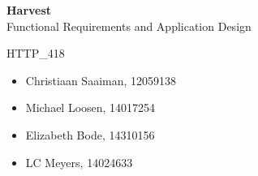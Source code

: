 \documentclass[11pt,fleqn]{book} %
\begin{document}

\begingroup
\thispagestyle{empty}
\centering
\vspace*{5cm}
\par\normalfont\fontsize{35}{35}\sffamily\selectfont
\textbf{Harvest}\\
{\LARGE Functional Requirements and Application Design}\par %
\vspace*{0.5cm}
{\Huge HTTP\_418}\par
\centering
\vspace*{0.5cm}
\begin{itemize}[label={}, noitemsep]	
		\Large
		\item \begin{center} Christiaan Saaiman, 12059138 \end{center}
		\item \begin{center} Michael Loosen, 14017254 \end{center}
		\item \begin{center} Elizabeth Bode, 14310156 \end{center}
		\item \begin{center} LC Meyers, 14024633 \end{center}	
\end{itemize}
\endgroup



\pagestyle{empty} %

\tableofcontents %


\pagestyle{fancy} %

\end{document}
